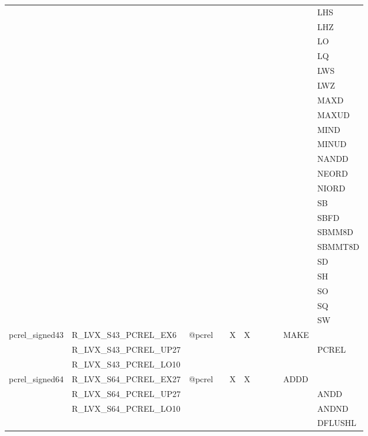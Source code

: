 {\begin{tabular}{|l|l|l|l|l|l|l|l|l|l|l|}
 & & & & & & & & & & \textsf{LHS} \\
 & & & & & & & & & & \textsf{LHZ} \\
 & & & & & & & & & & \textsf{LO} \\
 & & & & & & & & & & \textsf{LQ} \\
 & & & & & & & & & & \textsf{LWS} \\
 & & & & & & & & & & \textsf{LWZ} \\
 & & & & & & & & & & \textsf{MAXD} \\
 & & & & & & & & & & \textsf{MAXUD} \\
 & & & & & & & & & & \textsf{MIND} \\
 & & & & & & & & & & \textsf{MINUD} \\
 & & & & & & & & & & \textsf{NANDD} \\
 & & & & & & & & & & \textsf{NEORD} \\
 & & & & & & & & & & \textsf{NIORD} \\
 & & & & & & & & & & \textsf{SB} \\
 & & & & & & & & & & \textsf{SBFD} \\
 & & & & & & & & & & \textsf{SBMM8D} \\
 & & & & & & & & & & \textsf{SBMMT8D} \\
 & & & & & & & & & & \textsf{SD} \\
 & & & & & & & & & & \textsf{SH} \\
 & & & & & & & & & & \textsf{SO} \\
 & & & & & & & & & & \textsf{SQ} \\
 & & & & & & & & & & \textsf{SW} \\
\hline
\textsf{pcrel\_signed43} & \textsf{R\_LVX\_S43\_PCREL\_EX6} & \textsf{@pcrel} & \textsf{} & \textsf{X} & \textsf{X} & \textsf{} & \textsf{} & \textsf{} & \textsf{MAKE} \\
 & \textsf{R\_LVX\_S43\_PCREL\_UP27} & & & & & & & & & \textsf{PCREL} \\
 & \textsf{R\_LVX\_S43\_PCREL\_LO10} & & & & & & & & & \\
\hline
\textsf{pcrel\_signed64} & \textsf{R\_LVX\_S64\_PCREL\_EX27} & \textsf{@pcrel} & \textsf{} & \textsf{X} & \textsf{X} & \textsf{} & \textsf{} & \textsf{} & \textsf{ADDD} \\
 & \textsf{R\_LVX\_S64\_PCREL\_UP27} & & & & & & & & & \textsf{ANDD} \\
 & \textsf{R\_LVX\_S64\_PCREL\_LO10} & & & & & & & & & \textsf{ANDND} \\
 & & & & & & & & & & \textsf{DFLUSHL} \\

\end{tabular}}
